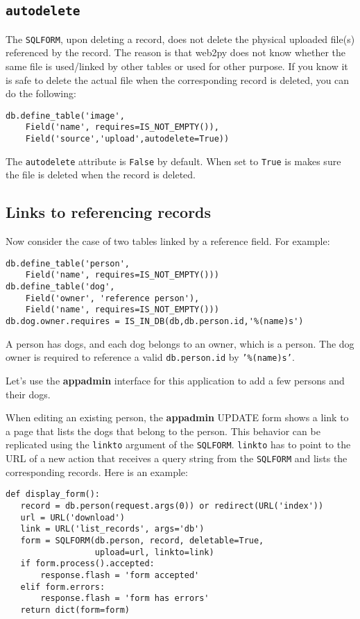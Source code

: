 \documentclass[justified,sixbynine,notoc]{tufte-book}
\def\ft{\small\tt}
\def\inxx#1{\index{#1}}
\begin{document}
\begin{fullwidth}
\goodbreak\subsection{{\ft autodelete}}

\inxx{autodelete}

The {\ft SQLFORM}, upon deleting a record, does not delete the physical uploaded file(s) referenced by the record. The reason is that web2py does not know whether the same file is used/linked by other tables or used for other purpose. If you know it is safe to delete the actual file when the corresponding record is deleted, you can do the following:
\begin{lstlisting}
db.define_table('image',
    Field('name', requires=IS_NOT_EMPTY()),
    Field('source','upload',autodelete=True))
\end{lstlisting}

The {\ft autodelete} attribute is {\ft False} by default. When set to {\ft True} is makes sure the file is deleted when the record is deleted.

\goodbreak\subsection{Links to referencing records}

Now consider the case of two tables linked by a reference field. For example:
\begin{lstlisting}
db.define_table('person',
    Field('name', requires=IS_NOT_EMPTY()))
db.define_table('dog',
    Field('owner', 'reference person'),
    Field('name', requires=IS_NOT_EMPTY()))
db.dog.owner.requires = IS_IN_DB(db,db.person.id,'%(name)s')
\end{lstlisting}

A person has dogs, and each dog belongs to an owner, which is a person. The dog owner is required to reference a valid {\ft db.person.id} by {\ft '\%(name)s'}.

Let's use the {\bf appadmin} interface for this application to add a
few persons and their dogs.

When editing an existing person, the {\bf appadmin} UPDATE form shows a link to a page that lists the dogs that belong to the person. This behavior can be replicated using the {\ft linkto} argument of the {\ft SQLFORM}. {\ft linkto} has to point to the URL of a new action that receives a query string from the {\ft SQLFORM} and lists the corresponding records.
Here is an example:
\begin{lstlisting}
def display_form():
   record = db.person(request.args(0)) or redirect(URL('index'))
   url = URL('download')
   link = URL('list_records', args='db')
   form = SQLFORM(db.person, record, deletable=True,
                  upload=url, linkto=link)
   if form.process().accepted:
       response.flash = 'form accepted'
   elif form.errors:
       response.flash = 'form has errors'
   return dict(form=form)
\end{lstlisting}


\end{fullwidth}
\end{document}
